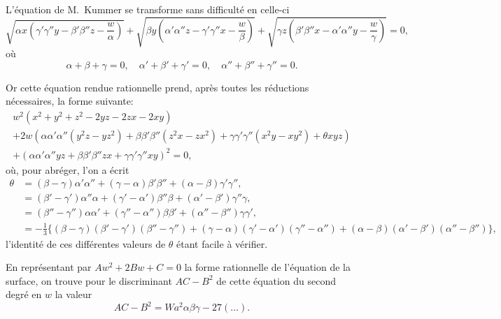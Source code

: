 \documentclass[11pt,a4paper]{article}
\begin{document}
\vspace{1em}

\noindent
L'\'{e}quation de M.~Kummer se transforme sans difficult\'{e} en celle-ci
\[
\sqrt{\alpha x \left(\gamma'\gamma'' y - \beta'\beta'' z - \frac{w}{\alpha}\right)}
+ \sqrt{\beta y \left(\alpha'\alpha'' z - \gamma'\gamma'' x - \frac{w}{\beta}\right)}
+ \sqrt{\gamma z \left(\beta'\beta'' x - \alpha'\alpha'' y - \frac{w}{\gamma}\right)} = 0,
\]
o\`{u}
\[
\alpha + \beta + \gamma = 0,\quad \alpha' + \beta' + \gamma' = 0,\quad \alpha'' + \beta'' + \gamma'' = 0.
\]

Or cette \'{e}quation rendue rationnelle prend, apr\`{e}s toutes les r\'{e}ductions n\'{e}cessaires, la forme suivante:
\begin{multline*}
w^2(x^2 + y^2 + z^2 - 2yz - 2zx - 2xy) \\
+ 2w(\alpha\alpha'\alpha''(y^2z - yz^2) + \beta\beta'\beta''(z^2x - zx^2) + \gamma\gamma'\gamma''(x^2y - xy^2) + \theta xyz) \\
+ (\alpha\alpha'\alpha'' yz + \beta\beta'\beta'' zx + \gamma\gamma'\gamma'' xy)^2 = 0,
\end{multline*}
o\`{u}, pour abr\'{e}ger, l'on a \'{e}crit
\begin{align*}
\theta &= (\beta - \gamma)\alpha'\alpha'' + (\gamma - \alpha)\beta'\beta'' + (\alpha - \beta)\gamma'\gamma'', \\
&= (\beta' - \gamma')\alpha''\alpha + (\gamma' - \alpha')\beta''\beta + (\alpha' - \beta')\gamma''\gamma, \\
&= (\beta'' - \gamma'')\alpha\alpha' + (\gamma'' - \alpha'')\beta\beta' + (\alpha'' - \beta'')\gamma\gamma', \\
&= -\tfrac{1}{3}\{(\beta - \gamma)(\beta' - \gamma')(\beta'' - \gamma'') + (\gamma - \alpha)(\gamma' - \alpha')(\gamma'' - \alpha'') + (\alpha - \beta)(\alpha' - \beta')(\alpha'' - \beta'')\},
\end{align*}
l'identit\'{e} de ces diff\'{e}rentes valeurs de $\theta$ \'{e}tant facile \`{a} v\'{e}rifier.

En repr\'{e}sentant par $Aw^2 + 2Bw + C = 0$ la forme rationnelle de l'\'{e}quation de la surface, on trouve pour le discriminant $AC - B^2$ de cette \'{e}quation du second degr\'{e} en $w$ la valeur
\[
AC - B^2 = Wa^2\alpha\beta\gamma - 27(\ldots).
\]
\end{document}
